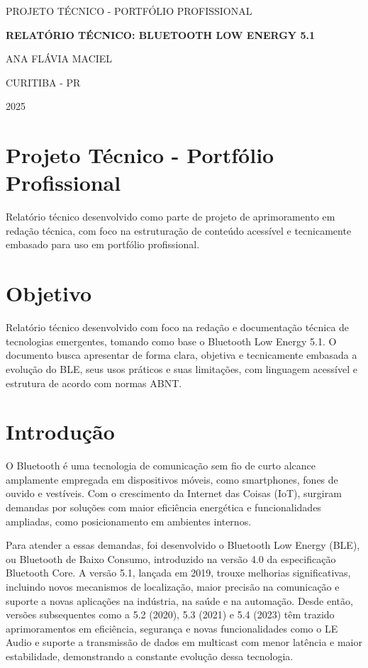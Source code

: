 \documentclass[12pt,a4paper]{report}
\begin{document}
\begin{titlepage}
    \centering
    {\Large PROJETO TÉCNICO - PORTFÓLIO PROFISSIONAL \par}
    \vspace{2cm}
    {\Huge \textbf{RELATÓRIO TÉCNICO: BLUETOOTH LOW ENERGY 5.1} \par}
    \vspace{2cm}
    {\Large ANA FLÁVIA MACIEL \par}
    \vfill
    {\large CURITIBA - PR \par}
    {\large 2025 \par}
\end{titlepage}

\chapter*{Projeto Técnico - Portfólio Profissional}
Relatório técnico desenvolvido como parte de projeto de aprimoramento em redação técnica, com foco na estruturação de conteúdo acessível e tecnicamente embasado para uso em portfólio profissional.

\chapter*{Objetivo}
Relatório técnico desenvolvido com foco na redação e documentação técnica de tecnologias emergentes, tomando como base o Bluetooth Low Energy 5.1. O documento busca apresentar de forma clara, objetiva e tecnicamente embasada a evolução do BLE, seus usos práticos e suas limitações, com linguagem acessível e estrutura de acordo com normas ABNT.

\tableofcontents

\chapter{Introdução}
O Bluetooth é uma tecnologia de comunicação sem fio de curto alcance amplamente empregada em dispositivos móveis, como smartphones, fones de ouvido e vestíveis. Com o crescimento da Internet das Coisas (IoT), surgiram demandas por soluções com maior eficiência energética e funcionalidades ampliadas, como posicionamento em ambientes internos.

Para atender a essas demandas, foi desenvolvido o Bluetooth Low Energy (BLE), ou Bluetooth de Baixo Consumo, introduzido na versão 4.0 da especificação Bluetooth Core. A versão 5.1, lançada em 2019, trouxe melhorias significativas, incluindo novos mecanismos de localização, maior precisão na comunicação e suporte a novas aplicações na indústria, na saúde e na automação. Desde então, versões subsequentes como a 5.2 (2020), 5.3 (2021) e 5.4 (2023) têm trazido aprimoramentos em eficiência, segurança e novas funcionalidades como o LE Audio e suporte a transmissão de dados em multicast com menor latência e maior estabilidade, demonstrando a constante evolução dessa tecnologia.
\end{document}
